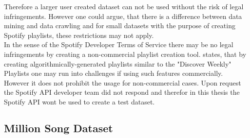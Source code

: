 Therefore a larger user created dataset can not be used without the risk of legal infringements. However one could argue, that there is a difference between data mining and data crawling and for small datasets with the purpose of creating Spotify playlists, these restrictions may not apply.\\ 
In the sense of the Spotify Developer Terms of Service \cite{spottac2} there may be no legal infringements by creating a non-commercial playlist creation tool. \cite{spottac3} states, that by creating algorithmically-generated playlists similar to the "Discover Weekly" Playlists one may run into challenges if using such features commercially. 
However it does not prohibit the usage for non-commercial cases.  
Upon request the Spotify API developer team did not respond and therefor in this thesis the Spotify API wont be used to create a test dataset.

\subsection{Million Song Dataset}

